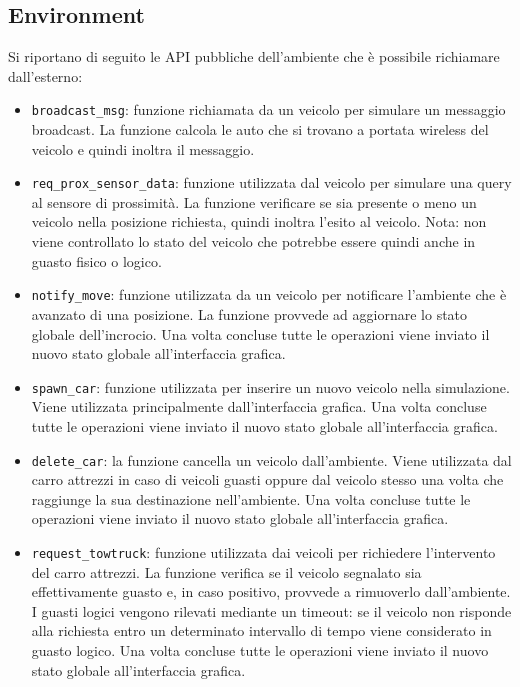 \documentclass{memoir}
\begin{document}
\subsection{Environment}

Si riportano di seguito le API pubbliche dell'ambiente che è possibile
richiamare dall'esterno:
\begin{itemize}
\item \texttt{broadcast\_msg}: funzione richiamata da un veicolo per simulare
  un messaggio broadcast. La funzione calcola le auto che si trovano a portata
  wireless del veicolo e quindi inoltra il messaggio.
\item \texttt{req\_prox\_sensor\_data}: funzione utilizzata dal veicolo per
  simulare una query al sensore di prossimità. La funzione verificare se sia
  presente o meno un veicolo nella posizione richiesta, quindi inoltra l'esito
  al veicolo. Nota: non viene controllato lo stato del veicolo che potrebbe
  essere quindi anche in guasto fisico o logico.
\item \texttt{notify\_move}: funzione utilizzata da un veicolo per notificare
  l'ambiente che è avanzato di una posizione. La funzione provvede ad aggiornare
  lo stato globale dell’incrocio. Una volta concluse tutte le operazioni viene
  inviato il nuovo stato globale all’interfaccia grafica.
\item \texttt{spawn\_car}: funzione utilizzata per inserire un nuovo veicolo
  nella simulazione. Viene utilizzata principalmente dall'interfaccia grafica.
  Una volta concluse tutte le operazioni viene inviato il nuovo stato globale
  all’interfaccia grafica.
\item \texttt{delete\_car}: la funzione cancella un veicolo dall'ambiente. Viene
  utilizzata dal carro attrezzi in caso di veicoli guasti oppure dal veicolo
  stesso una volta che raggiunge la sua destinazione nell’ambiente. Una volta
  concluse tutte le operazioni viene inviato il nuovo stato globale
  all’interfaccia grafica.
\item \texttt{request\_towtruck}: funzione utilizzata dai veicoli per richiedere
  l'intervento del carro attrezzi. La funzione verifica se il veicolo segnalato
  sia effettivamente guasto e, in caso positivo, provvede a rimuoverlo
  dall’ambiente. I guasti logici vengono rilevati mediante un timeout: se il
  veicolo non risponde alla richiesta entro un determinato intervallo di tempo
  viene considerato in guasto logico. Una volta concluse tutte le operazioni
  viene inviato il nuovo stato globale all’interfaccia grafica.
\end{itemize}
\end{document}
